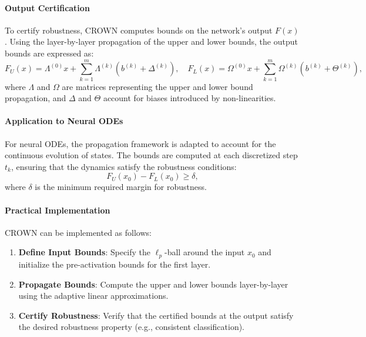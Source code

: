 \paragraph{Output Certification}
To certify robustness, CROWN computes bounds on the network's output \(F(x)\). Using the layer-by-layer propagation of the upper and lower bounds, the output bounds are expressed as:
\[
F_U(x) = \Lambda^{(0)} x + \sum_{k=1}^m \Lambda^{(k)} (b^{(k)} + \Delta^{(k)}), \quad
F_L(x) = \Omega^{(0)} x + \sum_{k=1}^m \Omega^{(k)} (b^{(k)} + \Theta^{(k)}),
\]
where \(\Lambda\) and \(\Omega\) are matrices representing the upper and lower bound propagation, and \(\Delta\) and \(\Theta\) account for biases introduced by non-linearities.

\paragraph{Application to Neural ODEs}
For neural ODEs, the propagation framework is adapted to account for the continuous evolution of states. The bounds are computed at each discretized step \(t_k\), ensuring that the dynamics satisfy the robustness conditions:
\[
F_U(x_0) - F_L(x_0) \geq \delta,
\]
where \(\delta\) is the minimum required margin for robustness.

\paragraph{Practical Implementation}
CROWN can be implemented as follows:
\begin{enumerate}
    \item \textbf{Define Input Bounds}: Specify the \(\ell_p\)-ball around the input \(x_0\) and initialize the pre-activation bounds for the first layer.
    \item \textbf{Propagate Bounds}: Compute the upper and lower bounds layer-by-layer using the adaptive linear approximations.
    \item \textbf{Certify Robustness}: Verify that the certified bounds at the output satisfy the desired robustness property (e.g., consistent classification).
\end{enumerate}
